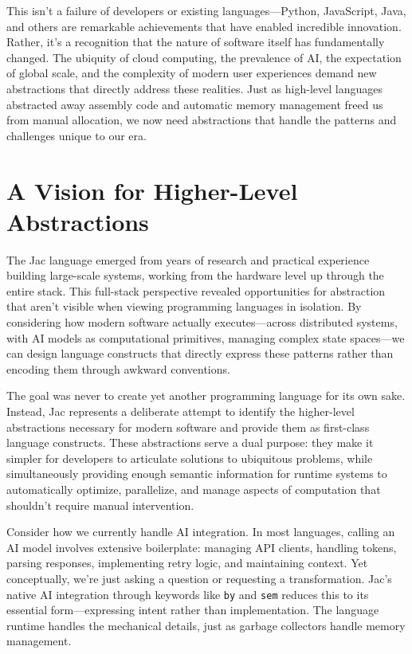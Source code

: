 This isn't a failure of developers or existing languages—Python, JavaScript, Java, and others are remarkable achievements that have enabled incredible innovation. Rather, it's a recognition that the nature of software itself has fundamentally changed. The ubiquity of cloud computing, the prevalence of AI, the expectation of global scale, and the complexity of modern user experiences demand new abstractions that directly address these realities. Just as high-level languages abstracted away assembly code and automatic memory management freed us from manual allocation, we now need abstractions that handle the patterns and challenges unique to our era.

\section{A Vision for Higher-Level Abstractions}

The Jac language emerged from years of research and practical experience building large-scale systems, working from the hardware level up through the entire stack. This full-stack perspective revealed opportunities for abstraction that aren't visible when viewing programming languages in isolation. By considering how modern software actually executes—across distributed systems, with AI models as computational primitives, managing complex state spaces—we can design language constructs that directly express these patterns rather than encoding them through awkward conventions.

The goal was never to create yet another programming language for its own sake. Instead, Jac represents a deliberate attempt to identify the higher-level abstractions necessary for modern software and provide them as first-class language constructs. These abstractions serve a dual purpose: they make it simpler for developers to articulate solutions to ubiquitous problems, while simultaneously providing enough semantic information for runtime systems to automatically optimize, parallelize, and manage aspects of computation that shouldn't require manual intervention.

Consider how we currently handle AI integration. In most languages, calling an AI model involves extensive boilerplate: managing API clients, handling tokens, parsing responses, implementing retry logic, and maintaining context. Yet conceptually, we're just asking a question or requesting a transformation. Jac's native AI integration through keywords like \texttt{by} and \texttt{sem} reduces this to its essential form—expressing intent rather than implementation. The language runtime handles the mechanical details, just as garbage collectors handle memory management.

